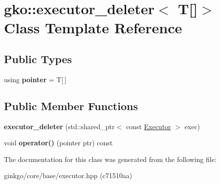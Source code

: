 \hypertarget{classgko_1_1executor__deleter_3_01T[]_4}{}\section{gko\+:\+:executor\+\_\+deleter$<$ T\mbox{[}\mbox{]}$>$ Class Template Reference}
\label{classgko_1_1executor__deleter_3_01T[]_4}
\subsection*{Public Types}
\begin{DoxyCompactItemize}
\item 
\mbox{\label{classgko_1_1executor__deleter_3_01T[]_4_ad28bfaa2f1d909bc11117a4889581a02}} 
using {\bfseries pointer} = T\mbox{[}$\,$\mbox{]}
\end{DoxyCompactItemize}
\subsection*{Public Member Functions}
\begin{DoxyCompactItemize}
\item 
\mbox{\label{classgko_1_1executor__deleter_3_01T[]_4_ab60279758e90bdcd14b076c55813d5be}} 
{\bfseries executor\+\_\+deleter} (std\+::shared\+\_\+ptr$<$ const \hyperlink{classgko_1_1Executor}{Executor} $>$ exec)
\item 
\mbox{\label{classgko_1_1executor__deleter_3_01T[]_4_a83f935eea2ed81964c8a018964c96934}} 
void {\bfseries operator()} (pointer ptr) const
\end{DoxyCompactItemize}


The documentation for this class was generated from the following file\+:\begin{DoxyCompactItemize}
\item 
ginkgo/core/base/executor.\+hpp (c71510aa)\end{DoxyCompactItemize}
